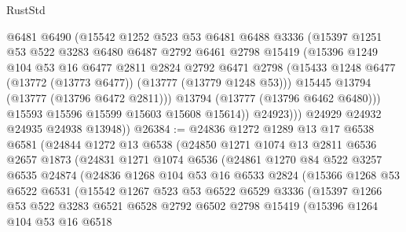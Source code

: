 \begin{lexlean}{RustStd}
\begin{coremodule}
                @6481
                @6490
                (@15542
                  @1252
                  @523
                  @53
                  @6481
                  @6488
                  @3336
                  (@15397
                    @1251
                    @53
                    @522
                    @3283
                    @6480
                    @6487
                    @2792
                    @6461
                    @2798
                    @15419
                    (@15396
                      @1249
                      @104
                      @53
                      @16
                      @6477
                      @2811
                      @2824
                      @2792
                      @6471
                      @2798
                      (@15433 @1248 @6477 (@13772 (@13773 @6477)) (@13777 (@13779 @1248 @53)))
                      @15445
                      @13794
                      (@13777 (@13796 @6472 @2811)))
                    @13794
                    (@13777 (@13796 @6462 @6480)))
                  @15593
                  @15596
                  @15599
                  @15603
                  @15608
                  @15614))
              @24923)))
        @24929
        @24932
        @24935
        @24938
        @13948))
@26384 := @24836
    @1272
    @1289
    @13
    @17
    @6538
    @6581
    (@24844
      @1272
      @13
      @6538
      (@24850
        @1271
        @1074
        @13
        @2811
        @6536
        @2657
        @1873
        (@24831
          @1271
          @1074
          @6536
          (@24861
            @1270
            @84
            @522
            @3257
            @6535
            @24874
            (@24836
              @1268
              @104
              @53
              @16
              @6533
              @2824
              (@15366
                @1268
                @53
                @6522
                @6531
                (@15542
                  @1267
                  @523
                  @53
                  @6522
                  @6529
                  @3336
                  (@15397
                    @1266
                    @53
                    @522
                    @3283
                    @6521
                    @6528
                    @2792
                    @6502
                    @2798
                    @15419
                    (@15396
                      @1264
                      @104
                      @53
                      @16
                      @6518

\end{coremodule}
\end{lexlean}
